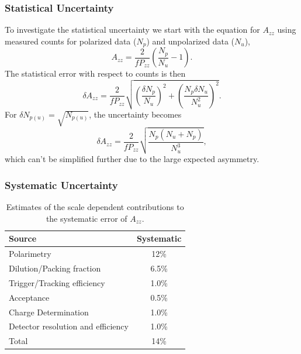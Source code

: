 
\subsubsection{Statistical Uncertainty}
\label{stat}
To investigate the statistical uncertainty we start with the equation for $A_{zz}$ using
measured counts for polarized data ($N_p$) and unpolarized data ($N_u$), 
\begin{equation}
A_{zz}=\frac{2}{fP_{zz}}\left(\frac{N_p}{N_u}-1\right).
\end{equation}
The statistical error with respect to counts is then
\begin{equation}
\delta A_{zz}=\frac{2}{fP_{zz}}\sqrt{\left(\frac{\delta N_p}{N_u}\right)^2+\left(\frac{N_p\delta N_u}{N_u^2}\right)^2}.
\end{equation}
For $\delta N_{p(u)}=\sqrt{N_{p(u)}}$, the uncertainty becomes
\begin{equation}
\delta A_{zz}=\frac{2}{fP_{zz}}\sqrt{\frac{N_p(N_u + N_p)}{N_u^3}},
\end{equation}
which can't be simplified further due to the large expected asymmetry.


\subsubsection{Systematic Uncertainty}%
\begin{table}
\begin{center}
\begin{tabular}{l|c}\hline\hline
Source                         & Systematic \\
\hline
Polarimetry                  &   12\%   \\
Dilution/Packing fraction    &   6.5\%   \\
Trigger/Tracking efficiency  & 1.0\% \\
Acceptance  		     & 0.5\% \\
Charge Determination           &  1.0\%  \\
Detector resolution and efficiency & 1.0\% \\
\hline
Total  &  14\%   \\
\hline
\end{tabular}
\caption{\label{error1}Estimates of the scale dependent contributions to the systematic error of $A_{zz}$.}
\end{center}
\end{table}

